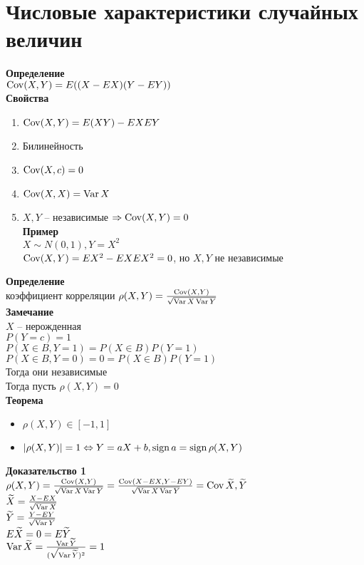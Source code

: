 \documentclass[12pt]{article}
\begin{document}
\section{Числовые характеристики случайных величин}
\textbf{Определение}\\
$\operatorname{Cov}(X, Y) = E((X-EX)(Y-EY))$\\
\textbf{Свойства}
\begin{enumerate}
    \item $\operatorname{Cov}(X, Y) = E(XY)-EXEY$
    \item Билинейность
    \item $\operatorname{Cov}(X, c) = 0$
    \item $\operatorname{Cov}(X, X) = \operatorname{Var} X$
    \item $X,Y$ -- независимые $\Rightarrow \operatorname{Cov} (X, Y) = 0$\\
    \textbf{Пример}\\
    $X \sim N(0, 1), Y = X^2$\\
    $\operatorname{Cov}(X, Y) = EX^2 - EXEX^2 = 0$, но $X, Y$ не независимые
\end{enumerate}
\textbf{Определение}\\
коэффициент корреляции $\rho(X,Y) = \frac{\operatorname{Cov}(X, Y)}{\sqrt{\operatorname{Var} X\operatorname{Var} Y}}$\\
\textbf{Замечание}\\
$X$ -- нерожденная\\
$P(Y = c) = 1$\\
$P(X \in B, Y = 1) = P(X \in B)P(Y = 1)$\\
$P(X \in B, Y = 0) = 0 = P(X \in B)P(Y = 1)$\\
Тогда они независимые\\
Тогда пусть $\rho(X, Y) = 0$\\
\textbf{Теорема}
\begin{itemize}
    \item $\rho(X, Y) \in [-1, 1]$
    \item $|\rho(X, Y)| = 1 \Leftrightarrow Y = aX + b, \operatorname{sign} a = \operatorname{sign} \rho(X, Y)$
\end{itemize}
\textbf{Доказательство 1}\\
$\rho(X, Y) = \frac{\operatorname{Cov}(X, Y)}{\sqrt{\operatorname{Var} X \operatorname{Var} Y}} = \frac{\operatorname{Cov}(X - EX, Y - EY)}{\sqrt{\operatorname{Var} X\operatorname{Var} Y}} = \operatorname{Cov} \widetilde X, \widetilde Y$\\
$\widetilde X = \frac{X-EX}{\sqrt{\operatorname{Var} X}}$\\
$\widetilde Y = \frac{Y-EY}{\sqrt{\operatorname{Var} Y}}$\\
$E \widetilde X = 0 = E\widetilde Y$\\
$\operatorname{Var} \widetilde X = \frac{\operatorname{Var} \widetilde Y}{(\sqrt{\operatorname{Var} \widetilde Y})^2} = 1$\\
\end{document}
